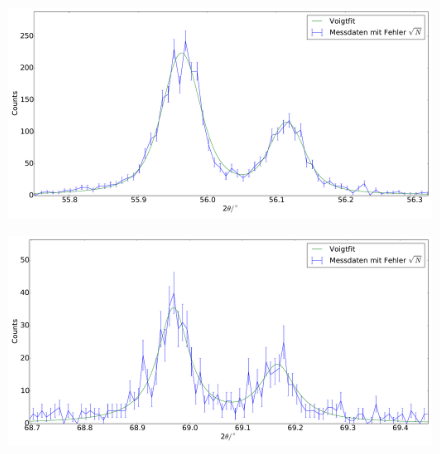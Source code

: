 \begin{figure}[H]
\begin{minipage}{.5\textwidth}
  \centering
  \includegraphics[scale=0.15]{messung_pulver_3}
  \label{fig:pul_mess_3}
\end{minipage}
\hspace{0.5cm}
\begin{minipage}{.5\textwidth}
  \centering
  \includegraphics[scale=0.15]{messung_pulver_4}
  \label{fig:pul_mess_4}
\end{minipage}
\end{figure}

